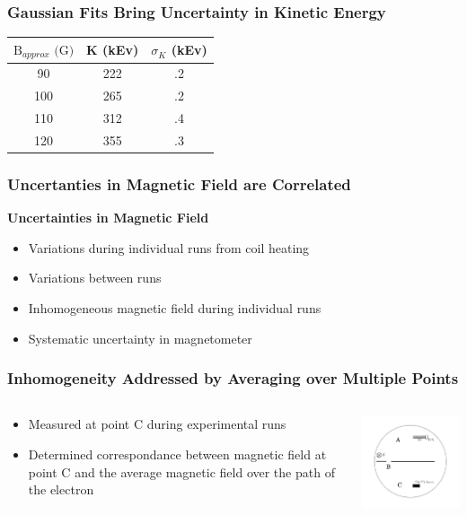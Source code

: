 \documentclass{beamer}
\begin{document}
\begin{frame}
  \frametitle{Gaussian Fits Bring Uncertainty in Kinetic Energy}
  \begin{table}
  \begin{ruledtabular}
    \begin{tabular}{ccc}
      $\text{B}_{approx} \text{ (G)}$ & K (kEv) & $\sigma_K$ (kEv) \\
      \hline
      90 & 222 & .2 \\
      100 & 265 & .2 \\
      110 & 312 & .4 \\
      120 & 355 & .3 \\
    \end{tabular}
  \end{ruledtabular}
\end{table}
\end{frame}

\begin{frame}
  \frametitle{Uncertanties in Magnetic Field are Correlated}
  \textbf{Uncertainties in Magnetic Field}
\pause
  \begin{itemize}
    \item Variations during individual runs from coil heating
      \pause
    \item Variations between runs
      \pause
    \item Inhomogeneous magnetic field during individual runs
      \pause
    \item Systematic uncertainty in magnetometer
  \end{itemize}
\end{frame}

\begin{frame}
  \frametitle{Inhomogeneity Addressed by Averaging over Multiple Points}
  \begin{columns}
  \begin{column}{0.5\textwidth}
      \begin{itemize}
        \item Measured at point C during experimental runs
        \item Determined correspondance between magnetic field at point C and the average magnetic field over the path of the electron
      \end{itemize}
\end{column}
    \begin{column}{0.5\textwidth}
  \includegraphics[width=6cm]{inhomo.png}
\end{column}
\end{columns}
\end{frame}
\end{document}
